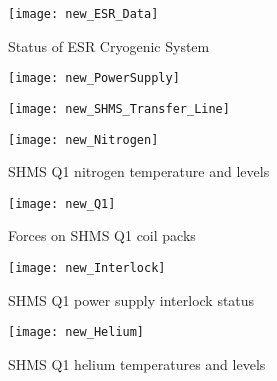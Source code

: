 {\begin{figure}
\begin{center}
\texttt{[image: new\_ESR\_Data]}
\caption{\label{fig:magc_ESR_Data}Status of ESR Cryogenic System}
\end{center}
\end{figure}


\begin{figure}
\begin{center}
\texttt{[image: new\_PowerSupply]}
\caption{\label{fig:magc_PowerSupply}}
\end{center}
\end{figure}


\begin{figure}
\begin{center}
\texttt{[image: new\_SHMS\_Transfer\_Line]}
\caption{\label{fig:magc_SHMS_Transfer_Line}}
\end{center}
\end{figure}


\begin{figure}
\begin{center}
\texttt{[image: new\_Nitrogen]}
\caption{\label{fig:magc_Nitrogen}SHMS Q1 nitrogen temperature and levels}
\end{center}
\end{figure}


\begin{figure}
\begin{center}
\texttt{[image: new\_Q1]}
\caption{\label{fig:magc_q1}Forces on SHMS Q1 coil packs}
\end{center}
\end{figure}


\begin{figure}
\begin{center}
\texttt{[image: new\_Interlock]}
\caption{\label{fig:magc_Interlock}SHMS Q1 power supply interlock status}
\end{center}
\end{figure}


\begin{figure}
\begin{center}
\texttt{[image: new\_Helium]}
\caption{\label{fig:magc_Helium}SHMS Q1 helium temperatures and levels}
\end{center}
\end{figure}

}
